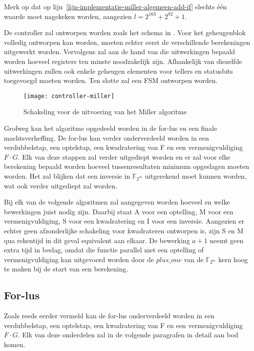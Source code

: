 Merk op dat op lijn~\ref{lijn-implementatie-miller-algemeen-add-if} slechts \'e\'en waarde moet nagekeken worden, aangezien $l = 2^{163} + 2^{82} + 1$.

De controller zal ontworpen worden zoals het schema in . Voor het geheugenblok volledig ontworpen kan worden, moeten echter eerst de verschillende berekeningen uitgewerkt worden. Vervolgens zal aan de hand van die uitwerkingen bepaald worden hoeveel registers ten minste noodzakelijk zijn. Afhankelijk van diezelfde uitwerkingen zullen ook enkele geheugen elementen voor tellers en statusbits toegevoegd moeten worden. Ten slotte zal een FSM ontworpen worden.

\begin{figure}[h]
	\centering
		\texttt{[image: controller-miller]}
		\caption{Schakeling voor de uitvoering van het Miller algoritme\label{figuur-implementatie-miller-controller}}
\end{figure}

Grofweg kan het algoritme opgedeeld worden in de for-lus  en een finale machtsverheffing. De for-lus kan verder onderverdeeld worden in een verdubbelstap, een optelstap, een kwadratering van F en een vermenigvuldiging $F \cdot G$. Elk van deze stappen zal verder uitgediept worden en er zal voor elke berekening bepaald worden hoeveel tussenresultaten minimum opgeslagen moeten worden. Het zal blijken dat een inversie in $\mathbb{F}_{2^m}$ uitgerekend moet kunnen worden, wat ook verder uitgediept zal worden.

Bij elk van de volgende algoritmen zal aangegeven worden hoeveel en welke bewerkingen juist nodig zijn. Daarbij staat \textsf{A} voor een optelling, \textsf{M} voor een vermenigvuldiging, \textsf{S} voor een kwadratering en \textsf{I} voor een inversie. Aangezien er echter geen afzonderlijke schakeling voor kwadrateren ontworpen is, zijn \textsf{S} en \textsf{M} qua rekentijd in dit geval equivalent aan elkaar. De bewerking $a + 1$ neemt geen extra tijd in beslag, omdat die functie parallel met een optelling of vermenigvuldiging kan uitgevoerd worden door de $plus\_one$ van de $\mathbb{F}_{2^m}$ kern hoog te maken bij de start van een berekening.

\subsection{For-lus\label{subsectie-implementatie-miller-forlus}}

Zoals reeds eerder vermeld kan de for-lus onderverdeeld worden in een verdubbelstap, een optelstap, een kwadratering van F en een vermenigvuldiging $F \cdot G$. Elk van deze onderdelen zal in de volgende paragrafen in detail aan bod komen.

